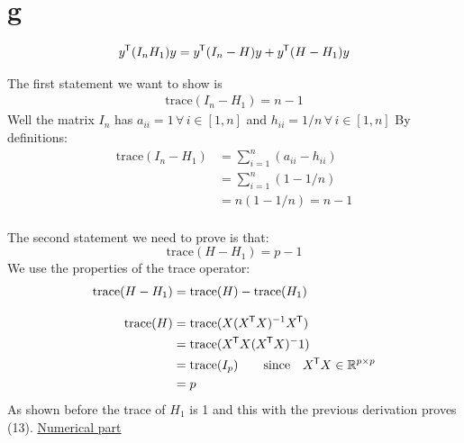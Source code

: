 \documentclass{article}\usepackage[]{graphicx}\usepackage[]{color}
\newcommand*{\tran}{^{\mkern-1.5mu\mathsf{T}}}%
\newcommand{\trace}{\mathrm{trace}}
\begin{document}
\section*{g}
\begin{align*}
	y\tran (I_n H_1)y = y\tran(I_n - H)y + y\tran(H-H_1)y 	
	\end{align*}
	
	The first statement we want to show is
	\begin{align*}
		\mathrm{trace}(I_n -H_1) = n-1
	\end{align*}
	Well the matrix $I_n$ has $a_{ii} = 1 \, \forall \, i\in [1,n]$ and $h _{ii} = 1/n \, \forall \, i \in [1,n]$
	By definitions:
	\begin{align}
		\mathrm{trace}(I_n-H_1) &= \sum_{i=1}^{n}(a_{ii} - h_{ii})\\[2ex]
		&= \sum_{i=1}^{n}(1-1/n)\\[2ex]
		&= n(1-1/n) = n-1
	\end{align}\\
	
	The second statement we need to prove is that:
	\begin{equation}
		\mathrm{trace}(H-H_1) = p-1
	\end{equation}
	We use the properties of the trace operator:
	\begin{align}
		\mathrm{trace}(H-H_1) &= \trace(H) - \trace(H_1)\\[2ex]
		\trace(H)&= \trace(X(X\tran X)^{-1}X\tran)\\
		&= \trace(X\tran X (X\tran X)^-1) \\
		&= \trace(I_p) \qquad \text{since} \quad X\tran X \in \mathbb{R}^{p\times p}\\
		&= p
	\end{align}
	As shown before the trace of $H_1$ is 1 and this with the previous derivation proves (13). 
\clearpage
\underline{Numerical part}
\end{document}

